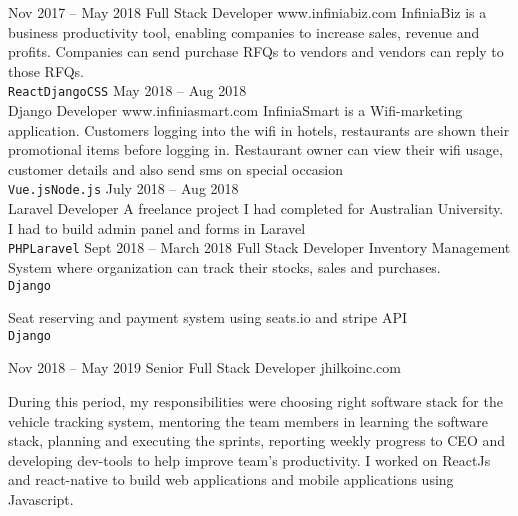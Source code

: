 \documentclass[9pt]{developercv} %
\begin{document}
\begin{entrylist}
\entry
		{Nov 2017 -- May 2018}
		{Full Stack Developer}
		{www.infiniabiz.com}
    		{
    InfiniaBiz is a business productivity tool, enabling companies to increase sales, revenue and profits. Companies can send purchase RFQs to vendors and vendors can reply to those RFQs.\\ 
    		    \texttt{React}\slashsep{}\slashsep\texttt{Django}\slashsep\texttt{CSS}\slashsep{}\slashsep{}\slashsep{}}
	\entry
		{May 2018 -- Aug 2018\\\footnotesize{}}
		{Django Developer}
		{www.infiniasmart.com}
		{
		    InfiniaSmart is a Wifi-marketing application. Customers logging into the wifi in hotels, restaurants are shown their promotional items before logging in. Restaurant owner can view their wifi usage, customer details and also send sms on special occasion\\
		    \texttt{Vue.js}\slashsep\texttt{Node.js}\slashsep{}\slashsep{}\slashsep{}
		}
	\entry
		{July 2018 -- Aug 2018\\\footnotesize{}}
		{Laravel Developer}
		{}
		{
		   A freelance project I had completed for Australian University. I had to build admin panel and forms in Laravel\\ \texttt{PHP}\slashsep\texttt{Laravel}
		}
	\entry
	    {Sept 2018 -- March 2018}
	    {Full Stack Developer}
	    {}
	    {
	        Inventory Management System where organization can track their stocks, sales and purchases.\\
	        \texttt{Django}\slashsep{}\slashsep{}\slashsep{}
	    }
	    
	    {Seat reserving and payment system using seats.io and stripe API\\
	        \texttt{Django}\slashsep{}\slashsep{}\slashsep{}
	    }
	    
	  \entry
		 {Nov 2018 -- May 2019}
		{Senior Full Stack Developer}
		{jhilkoinc.com}
		{
		During this period, my responsibilities were choosing right software stack for the vehicle tracking system, mentoring the team members in learning the software stack, planning and executing the sprints, reporting weekly progress to CEO and developing dev-tools to help improve team’s productivity. I worked on ReactJs and react-native to build web applications and mobile applications using Javascript.

}
\end{entrylist}
\end{document}
